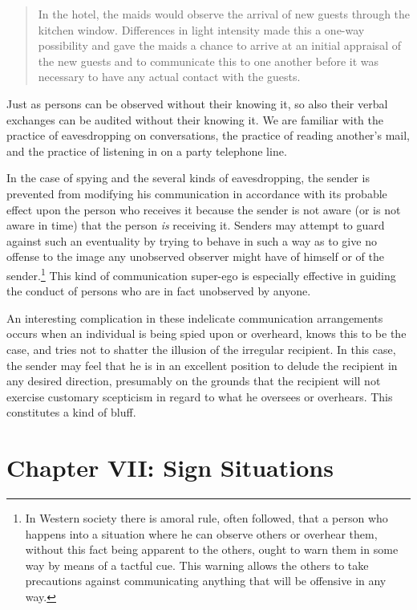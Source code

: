 \documentclass[openany,nobib]{tufte-book}
\let\oldchapter\chapter
\def\chapter{%
  \setcounter{footnote}{0}%
  \oldchapter
}
\begin{document}
\begin{quote}
In the hotel, the maids would observe the arrival of new guests through
the kitchen window. Differences in light intensi­ty made this a one-way
possibility and gave the maids a chance to arrive at an initial
appraisal of the new guests and to communicate this to one another
before it was necessary to have any actual contact with the guests.
\end{quote}

\noindent Just as persons can be observed without their knowing it, so also their
verbal exchanges can be audited without their knowing it. We are
familiar with the practice of eavesdropping on conversations, the
practice of reading another's mail, and the practice of listening in on
a party telephone line.

In the case of spying and the several kinds of eaves­dropping, the sender
is prevented from modifying his communication in accordance with its
probable effect upon the person who receives it because the sender is
not aware (or is not aware in time) that the person \emph{is }receiving
it. Senders may attempt to guard against such an eventuality by trying
to behave in such a way as to give no offense to the image any
unobserved observer might have of himself or of the sender.\footnote{In
  Western society there is amoral rule, often followed, that a person
  who happens into a situation where he can observe others or overhear
  them, without this fact being apparent to the others, ought to warn
  them in some way by means of a tactful cue. This warning allows the
  others to take precautions against communicating anything that will be
  offensive in any way.} This kind of communication super-ego is
especially effective in guiding the conduct of persons who are in fact
unobserved by anyone.

An interesting complication in these indelicate communication
arrangements occurs when an individual is being spied upon or overheard,
knows this to be the case, and tries not to shatter the illusion of the
irregular recipient. In this case, the sender may feel that he is in an
excellent position to de­lude the recipient in any desired direction,
presumably on the grounds that the recipient will not exercise customary
scepticism in regard to what he oversees or overhears. This constitutes
a kind of bluff.

\chapter[CHAPTER VII: SIGN SITUATIONS]{Chapter VII: Sign Situations}
\label{ch:Chapter VII: Sign Situations}
\end{document}
